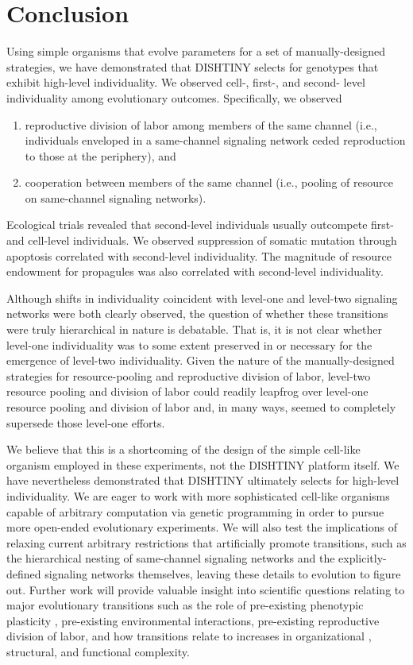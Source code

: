 \section{Conclusion}

Using simple organisms that evolve parameters for a set of manually-designed strategies, we have demonstrated that DISHTINY selects for genotypes that exhibit high-level individuality.
We observed cell-, first-, and second- level individuality among evolutionary outcomes.
Specifically, we observed
\begin{enumerate}
  \item reproductive division of labor among members of the same channel (i.e., individuals enveloped in a same-channel signaling network ceded reproduction to those at the periphery), and
  \item cooperation between members of the same channel (i.e., pooling of resource on same-channel signaling networks).
\end{enumerate}

Ecological trials revealed that second-level individuals usually outcompete first- and cell-level individuals.
We observed suppression of somatic mutation through apoptosis correlated with second-level individuality.
The magnitude of resource endowment for propagules was also correlated with second-level individuality.

Although shifts in individuality coincident with level-one and level-two signaling networks were both clearly observed, the question of whether these transitions were truly hierarchical in nature is debatable.
That is, it is not clear whether level-one individuality was to some extent preserved in or necessary for the emergence of level-two individuality.
Given the nature of the manually-designed strategies for resource-pooling and reproductive division of labor, level-two resource pooling and division of labor could readily leapfrog over level-one resource pooling and division of labor and, in many ways, seemed to completely supersede those level-one efforts.

We believe that this is a shortcoming of the design of the simple cell-like organism employed in these experiments, not the DISHTINY platform itself.
We have nevertheless demonstrated that DISHTINY ultimately selects for high-level individuality.
We are eager to work with more sophisticated cell-like organisms capable of arbitrary computation via genetic programming in order to pursue more open-ended evolutionary experiments. %
We will also test the implications of relaxing current arbitrary restrictions that artificially promote transitions, such as the hierarchical nesting of same-channel signaling networks and the explicitly-defined signaling networks themselves, leaving these details to evolution to figure out.
Further work will provide valuable insight into scientific questions relating to major evolutionary transitions such as the role of pre-existing phenotypic plasticity \citep{clune2007investigating, lalejini2016evolutionary}, pre-existing environmental interactions, pre-existing reproductive division of labor, and how transitions relate to increases in organizational \citep{goldsby2012task}, structural, and functional \citep{goldsby2014evolutionary} complexity.

